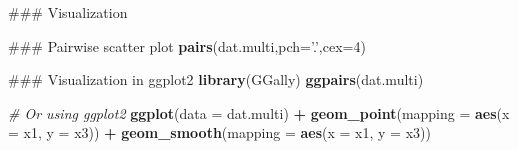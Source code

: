 \documentclass[12pt,]{book}
\newenvironment{Shaded}{\begin{snugshade}}{\end{snugshade}}
\newcommand{\KeywordTok}[1]{\textcolor[rgb]{0.13,0.29,0.53}{\textbf{#1}}}
\newcommand{\DataTypeTok}[1]{\textcolor[rgb]{0.13,0.29,0.53}{#1}}
\newcommand{\DecValTok}[1]{\textcolor[rgb]{0.00,0.00,0.81}{#1}}
\newcommand{\StringTok}[1]{\textcolor[rgb]{0.31,0.60,0.02}{#1}}
\newcommand{\CommentTok}[1]{\textcolor[rgb]{0.56,0.35,0.01}{\textit{#1}}}
\newcommand{\OperatorTok}[1]{\textcolor[rgb]{0.81,0.36,0.00}{\textbf{#1}}}
\newcommand{\NormalTok}[1]{#1}
\begin{document}
\begin{Shaded}
\begin{Highlighting}[]
\NormalTok{### Visualization}

\NormalTok{### Pairwise scatter plot}
\KeywordTok{pairs}\NormalTok{(dat.multi,}\DataTypeTok{pch=}\StringTok{'.'}\NormalTok{,}\DataTypeTok{cex=}\DecValTok{4}\NormalTok{)}
\end{Highlighting}
\end{Shaded}

\begin{Shaded}
\begin{Highlighting}[]
\NormalTok{### Visualization in ggplot2}
\KeywordTok{library}\NormalTok{(GGally)}
\KeywordTok{ggpairs}\NormalTok{(dat.multi)}
\end{Highlighting}
\end{Shaded}

\begin{Shaded}
\end{Shaded}

\begin{Shaded}
\begin{Highlighting}[]
\CommentTok{# Or using ggplot2}
\KeywordTok{ggplot}\NormalTok{(}\DataTypeTok{data =}\NormalTok{ dat.multi) }\OperatorTok{+}\StringTok{ }
\StringTok{  }\KeywordTok{geom_point}\NormalTok{(}\DataTypeTok{mapping =} \KeywordTok{aes}\NormalTok{(}\DataTypeTok{x =}\NormalTok{ x1, }\DataTypeTok{y =}\NormalTok{ x3)) }\OperatorTok{+}
\StringTok{  }\KeywordTok{geom_smooth}\NormalTok{(}\DataTypeTok{mapping =} \KeywordTok{aes}\NormalTok{(}\DataTypeTok{x =}\NormalTok{ x1, }\DataTypeTok{y =}\NormalTok{ x3))}
\end{Highlighting}
\end{Shaded}


\end{document}
